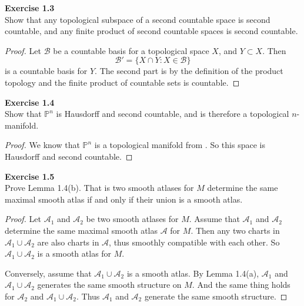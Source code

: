 \documentclass[12pt, a4paper]{article}
\theoremstyle{plain}
\newcommand{\A}{\mathscr{A}}
\newcommand{\B}{\mathscr{B}}
\newcommand{\set}[1]{\mathbb{#1}}
\newenvironment{exercise}[2][Exercise]
    { \begin{mdframed}[backgroundcolor=gray!20] \textbf{#1 #2} \\}
    {  \end{mdframed}}
\begin{document}
\begin{exercise}{1.3}
    Show that any topological subspace of a second countable space is second countable, and any finite product of second countable spaces is second countable.
\end{exercise}
    \begin{proof}
        Let $\B$ be a countable basis for a topological space $X$, and $Y\subset X$. Then 
        \[
        \B' = \{X\cap Y:X\in\B\}
        \]
        is a countable basis for $Y$. The second part is by the definition of the product topology and the finite product of countable sets is countable.
    \end{proof}

\begin{exercise}{1.4}
    Show that $\set{P}^n$ is Hausdorff and second countable, and is therefore a topological $n$-manifold.
\end{exercise}  
    \begin{proof}
        We know that $\set{P}^n$ is a topological manifold from \cite{Lee1}. So this space is Hausdorff and second countable.
    \end{proof}

\begin{exercise}{1.5}
    Prove Lemma 1.4(b). That is two smooth atlases for $M$ determine the same maximal smooth atlas if and only if their union is a smooth atlas.
\end{exercise}
    \begin{proof}
        Let $\A_1$ and $\A_2$ be two smooth atlases for $M$. Assume that $\A_1$ and $\A_2$ determine the same maximal smooth atlas $\A$ for $M$. Then any two charts in $\A_1\cup \A_2$ are also charts in $\A$, thus smoothly compatible with each other. So $\A_1\cup \A_2$ is a smooth atlas for $M$.

        Conversely, assume that $\A_1\cup \A_2$ is a smooth atlas. By Lemma 1.4(a), $\A_1$ and $\A_1\cup \A_2$ generates the same smooth structure on $M$. And the same thing holds for $\A_2$ and $\A_1\cup \A_2$. Thus $\A_1$ and $\A_2$ generate the same smooth structure.
    \end{proof}
\end{document}

